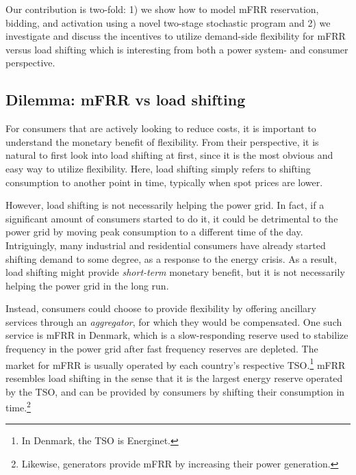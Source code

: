 Our contribution is two-fold: 1) we show how to model mFRR reservation, bidding, and activation using a novel two-stage stochastic program and 2) we investigate and discuss the incentives to utilize demand-side flexibility for mFRR versus load shifting which is interesting from both a power system- and consumer perspective. %

\IEEEpubidadjcol


\subsection{Dilemma: mFRR vs load shifting}

For consumers that are actively looking to reduce costs, it is important to understand the monetary benefit of flexibility. From their perspective, it is natural to first look into load shifting at first, since it is the most obvious and easy way to utilize flexibility. Here, load shifting simply refers to shifting consumption to another point in time, typically when spot prices are lower.

However, load shifting is not necessarily helping the power grid.
In fact, if a significant amount of consumers started to do it, it could be detrimental to the power grid by moving peak consumption to a different time of the day.
Intriguingly, many industrial and residential consumers have already started shifting demand to some degree, as a response to the energy crisis. 
As a result, load shifting might provide \textit{short-term} monetary benefit, but it is not necessarily helping the power grid in the long run.

Instead, consumers could choose to provide flexibility by offering ancillary services through an \textit{aggregator}, for which they would be compensated.
One such service is mFRR in Denmark, which is a slow-responding reserve used to stabilize frequency in the power grid after fast frequency reserves are depleted. The market for mFRR is usually operated by each country's respective TSO.\footnote{In Denmark, the TSO is Energinet.} mFRR resembles load shifting in the sense that it is the largest energy reserve operated by the TSO, and can be provided by consumers by shifting their consumption in time.\footnote{Likewise, generators provide mFRR by increasing their power generation.}

